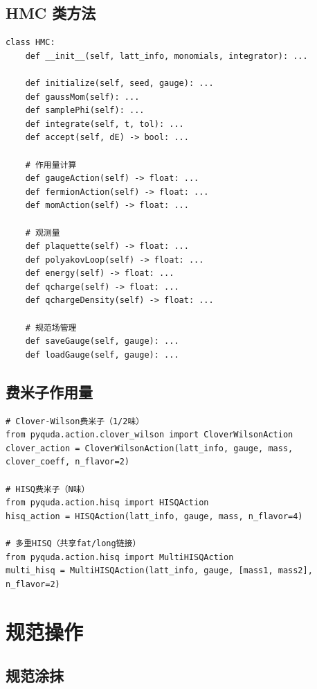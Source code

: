 \documentclass[12pt,a4paper]{ctexart}
\begin{document}
\subsection{HMC 类方法}

\begin{lstlisting}[caption={HMC 完整接口}]
class HMC:
    def __init__(self, latt_info, monomials, integrator): ...

    def initialize(self, seed, gauge): ...
    def gaussMom(self): ...
    def samplePhi(self): ...
    def integrate(self, t, tol): ...
    def accept(self, dE) -> bool: ...

    # 作用量计算
    def gaugeAction(self) -> float: ...
    def fermionAction(self) -> float: ...
    def momAction(self) -> float: ...

    # 观测量
    def plaquette(self) -> float: ...
    def polyakovLoop(self) -> float: ...
    def energy(self) -> float: ...
    def qcharge(self) -> float: ...
    def qchargeDensity(self) -> float: ...

    # 规范场管理
    def saveGauge(self, gauge): ...
    def loadGauge(self, gauge): ...
\end{lstlisting}

\subsection{费米子作用量}

\begin{lstlisting}[caption={费米子作用量}]
# Clover-Wilson费米子（1/2味）
from pyquda.action.clover_wilson import CloverWilsonAction
clover_action = CloverWilsonAction(latt_info, gauge, mass, clover_coeff, n_flavor=2)

# HISQ费米子（N味）
from pyquda.action.hisq import HISQAction
hisq_action = HISQAction(latt_info, gauge, mass, n_flavor=4)

# 多重HISQ（共享fat/long链接）
from pyquda.action.hisq import MultiHISQAction
multi_hisq = MultiHISQAction(latt_info, gauge, [mass1, mass2], n_flavor=2)
\end{lstlisting}

\section{规范操作}

\subsection{规范涂抹}
\end{document}
